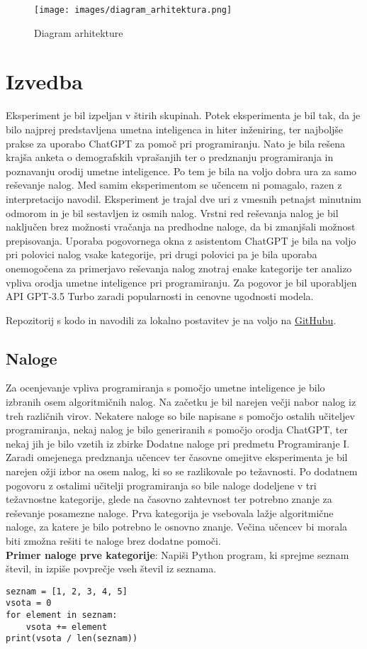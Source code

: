 \documentclass[a4paper,12pt,openright]{book}
\begin{document}
\begin{figure}[H]
    \centering
    \texttt{[image: images/diagram\_arhitektura.png]}
    \caption{Diagram arhitekture}
    \label{fig:enter-label}
\end{figure}
\section{Izvedba}

Eksperiment je bil izpeljan v štirih skupinah. Potek eksperimenta je bil tak, da je bilo najprej predstavljena umetna inteligenca in hiter inženiring, ter najboljše prakse za uporabo ChatGPT za pomoč pri programiranju. Nato je bila rešena krajša anketa o demografskih vprašanjih ter o predznanju programiranja in poznavanju orodij umetne inteligence. Po tem je bila na voljo dobra ura za samo reševanje nalog. Med samim eksperimentom se učencem ni pomagalo, razen z interpretacijo navodil.
Eksperiment je trajal dve uri z vmesnih petnajst minutnim odmorom in je bil sestavljen iz osmih nalog. Vrstni red reševanja nalog je bil naključen brez možnosti vračanja na predhodne naloge, da bi zmanjšali možnost prepisovanja. Uporaba pogovornega okna z asistentom ChatGPT je bila na voljo pri polovici nalog vsake kategorije, pri drugi polovici pa je bila uporaba onemogočena za primerjavo reševanja nalog znotraj enake kategorije ter analizo vpliva orodja umetne inteligence pri programiranju. Za pogovor je bil uporabljen API GPT-3.5 Turbo zaradi popularnosti in cenovne ugodnosti modela.

Repozitorij s kodo in navodili za lokalno postavitev je na voljo na \href{https://github.com/spin311/hiter-inzeniring-diploma}{GitHubu}. 

\subsection{Naloge}
Za ocenjevanje vpliva programiranja s pomočjo umetne inteligence je bilo izbranih osem algoritmičnih nalog.
Na začetku je bil narejen večji nabor nalog iz treh različnih virov. Nekatere naloge so bile napisane s pomočjo ostalih učiteljev programiranja, nekaj nalog je bilo generiranih s pomočjo orodja ChatGPT, ter nekaj jih je bilo vzetih iz zbirke Dodatne naloge pri predmetu Programiranje I. \cite{dodatneNaloge}
Zaradi omejenega predznanja učencev ter časovne omejitve eksperimenta je bil narejen ožji izbor na osem nalog, ki so se razlikovale po težavnosti. Po dodatnem pogovoru z ostalimi učitelji programiranja so bile naloge dodeljene v tri težavnostne kategorije, glede na časovno zahtevnost ter potrebno znanje za reševanje posamezne naloge. Prva kategorija je vsebovala lažje algoritmične naloge, za katere je bilo potrebno le osnovno znanje. Večina učencev bi morala biti zmožna rešiti te naloge brez dodatne pomoči.
\\
\textbf{Primer naloge prve kategorije}:
Napiši Python program, ki sprejme seznam števil, in izpiše povprečje vseh števil iz seznama.
\begin{lstlisting}[style=python]
seznam = [1, 2, 3, 4, 5]
vsota = 0
for element in seznam:
    vsota += element
print(vsota / len(seznam))
\end{lstlisting}
    
\end{document}
